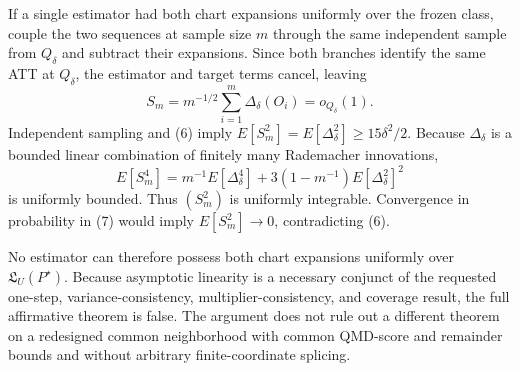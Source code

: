 If a single estimator had both chart expansions uniformly over the frozen class, couple the two sequences at sample size \(m\) through the same independent sample from \(Q_\delta\) and subtract their expansions.  Since both branches identify the same ATT at \(Q_\delta\), the estimator and target terms cancel, leaving
\[
 S_m=m^{-1/2}\sum_{i=1}^m\Delta_\delta(O_i)=o_{Q_\delta}(1).
 \tag{7}
\]
Independent sampling and (6) imply \(E[S_m^2]=E[\Delta_\delta^2]\ge15\delta^2/2\).  Because \(\Delta_\delta\) is a bounded linear combination of finitely many Rademacher innovations,
\[
 E[S_m^4]
 =m^{-1}E[\Delta_\delta^4]
 +3(1-m^{-1})E[\Delta_\delta^2]^2
 \tag{8}
\]
is uniformly bounded.  Thus \((S_m^2)\) is uniformly integrable.  Convergence in probability in (7) would imply \(E[S_m^2]\to0\), contradicting (6).

No estimator can therefore possess both chart expansions uniformly over \(\mathfrak L_U(P^{\star})\).  Because asymptotic linearity is a necessary conjunct of the requested one-step, variance-consistency, multiplier-consistency, and coverage result, the full affirmative theorem is false.  The argument does not rule out a different theorem on a redesigned common neighborhood with common QMD-score and remainder bounds and without arbitrary finite-coordinate splicing.

